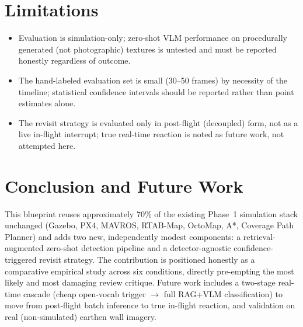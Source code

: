 \documentclass[11pt,a4paper]{article}
\begin{document}
\section{Limitations}
\begin{itemize}
    \item Evaluation is simulation-only; zero-shot VLM performance on procedurally generated (not photographic) textures is untested and must be reported honestly regardless of outcome.
    \item The hand-labeled evaluation set is small (30--50 frames) by necessity of the timeline; statistical confidence intervals should be reported rather than point estimates alone.
    \item The revisit strategy is evaluated only in post-flight (decoupled) form, not as a live in-flight interrupt; true real-time reaction is noted as future work, not attempted here.
\end{itemize}

\section{Conclusion and Future Work}
This blueprint reuses approximately 70\% of the existing Phase~1 simulation stack unchanged (Gazebo, PX4, MAVROS, RTAB-Map, OctoMap, A*, Coverage Path Planner) and adds two new, independently modest components: a retrieval-augmented zero-shot detection pipeline and a detector-agnostic confidence-triggered revisit strategy. The contribution is positioned honestly as a comparative empirical study across six conditions, directly pre-empting the most likely and most damaging review critique. Future work includes a two-stage real-time cascade (cheap open-vocab trigger $\to$ full RAG+VLM classification) to move from post-flight batch inference to true in-flight reaction, and validation on real (non-simulated) earthen wall imagery.

\end{document}
